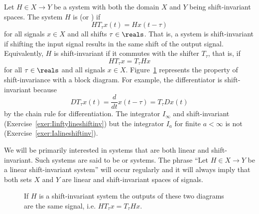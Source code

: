 Let $H \in X \to Y$ be a system with both the domain $X$ and $Y$ being shift-invariant spaces. The system $H$ is  (or ) if
\[
H T_\tau x(t) = Hx(t-\tau)
\]
for all signals $x \in X$ and all shifts $\tau\in\reals$.  That is, a system is shift-invariant if shifting the input signal results in the same shift of the output signal.  Equivalently, $H$ is shift-invariant if it commutes with the shifter $T_\tau$, that is, if
\[
H T_\tau x = T_\tau Hx
\]
for all $\tau \in \reals$ and all signals $x \in X$.  Figure~\ref{blockdiag:timeinvariance} represents the property of shift-invariance with a block diagram.  For example, the differentiator is shift-invariant because
\[
DT_\tau x(t) = \frac{d}{dt}x(t - \tau) = T_\tau Dx(t)
\]
by the chain rule for differentiation.  The integrator $I_\infty$ and shift-invariant (Exercise~\ref{exer:Iinftylineshiftinv}) but the integrator $I_a$ for finite $a < \infty$ is not (Exercise~\ref{exer:Ialineshiftinv}).

We will be primarily interested in systems that are both linear and shift-invariant.  Such systems are said to be  or  systems.  The phrase ``Let $H \in X \to Y$ be a linear shift-invariant system'' will occur regularly and it will always imply that both sets $X$ and $Y$ are linear and shift-invariant spaces of signals.

\begin{figure}[tbp]
\centering
{}
\qquad
{}
\caption{If $H$ is a shift-invariant system the outputs of these two diagrams are the same signal, i.e. $HT_\tau x = T_\tau Hx$.}\label{blockdiag:timeinvariance}
\end{figure}


